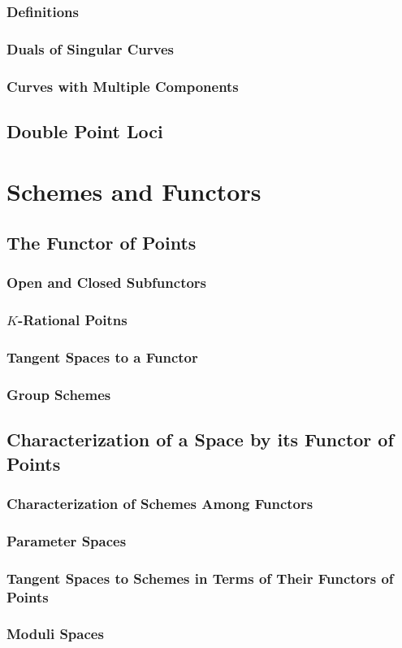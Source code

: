 \documentclass[oneside]{amsbook}
\numberwithin{ex}{chapter}
\begin{document}
\subsection{Definitions}

\subsection{Duals of Singular Curves}

\subsection{Curves with Multiple Components}


\section{Double Point Loci}


\chapter{Schemes and Functors}
\section{The Functor of Points}
\subsection{Open and Closed Subfunctors}

\subsection{$K$-Rational Poitns}

\subsection{Tangent Spaces to a Functor}

\subsection{Group Schemes}


\section{Characterization of a Space by its Functor of Points}
\subsection{Characterization of Schemes Among Functors}

\subsection{Parameter Spaces}

\subsection{Tangent Spaces to Schemes in Terms of Their Functors of Points}

\subsection{Moduli Spaces}

\end{document}
